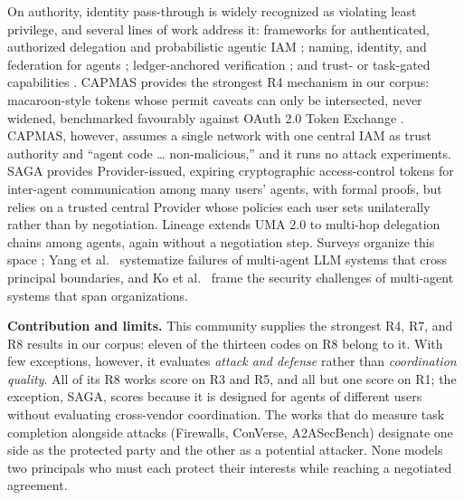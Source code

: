 \documentclass[conference]{IEEEtran}
\newcommand{\full}{{\small\CIRCLE}}
\newcommand{\half}{{\small\LEFTcircle}}
\newcommand{\none}{{\small\Circle}}
\begin{document}
On authority, identity pass-through is widely recognized as violating least privilege, and several lines of work address it: frameworks for authenticated, authorized delegation \cite{south2025authenticated} and probabilistic agentic IAM \cite{zouari2025agentic}; naming, identity, and federation for agents \cite{huang2025ans, huang2025zerotrust, nagabhushanaradhya2025oidca}; ledger-anchored verification \cite{zou2025blocka2a}; and trust- or task-gated capabilities \cite{nipu2026trustgated, elhelou2026hybrid, xu2025trust}. CAPMAS \cite{veski2026capmas} provides the strongest R4 mechanism in our corpus: macaroon-style tokens \cite{birgisson2014macaroons} whose permit caveats can only be intersected, never widened, benchmarked favourably against OAuth 2.0 Token Exchange \cite{rfc8693}. CAPMAS, however, assumes a single network with one central IAM as trust authority and ``agent code \ldots{} non-malicious,'' and it runs no attack experiments. SAGA \cite{syros2026saga} provides Provider-issued, expiring cryptographic access-control tokens for inter-agent communication among many users' agents, with formal proofs, but relies on a trusted central Provider whose policies each user sets unilaterally rather than by negotiation. Lineage \cite{stefanescu2026lineage} extends UMA 2.0 to multi-hop delegation chains among agents, again without a negotiation step. Surveys organize this space \cite{raza2025trism, vargas_identity, mostafavi2026trustworthy, forough2026confidential, kim2026sokagentic}; Yang et al.~\cite{yang2026soksafeagents} systematize failures of multi-agent LLM systems that cross principal boundaries, and Ko et al.~\cite{ko2026sevenchallenges} frame the security challenges of multi-agent systems that span organizations.

\textbf{Contribution and limits.} This community supplies the strongest R4, R7, and R8 results in our corpus: eleven of the thirteen \full{} codes on R8 belong to it. With few exceptions, however, it evaluates \emph{attack and defense} rather than \emph{coordination quality}. All of its R8 \full{} works score \none{} on R3 and R5, and all but one score \none{} on R1; the exception, SAGA, scores \half{} because it is designed for agents of different users without evaluating cross-vendor coordination. The works that do measure task completion alongside attacks (Firewalls, ConVerse, A2ASecBench) designate one side as the protected party and the other as a potential attacker. None models two principals who must each protect their interests while reaching a negotiated agreement.
\end{document}

